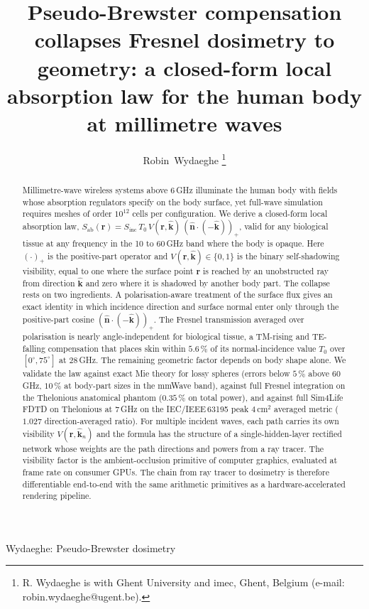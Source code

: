 \documentclass[journal,twocolumn,10pt]{IEEEtran}
\theoremstyle{plain}
\theoremstyle{remark}
\newcommand{\khat}{\hat{\bm{k}}}
\newcommand{\nhat}{\hat{\bm{n}}}
\newcommand{\rr}{\mathbf{r}}
\newcommand{\Sinc}{S_{\mathrm{inc}}}
\newcommand{\Sab}{S_{\mathrm{ab}}}
\newcommand{\pospart}[1]{\left(#1\right)_{+}}
\newcommand{\Vis}{V}
\begin{document}
\title{Pseudo-Brewster compensation collapses Fresnel
dosimetry to geometry: a closed-form local absorption
law for the human body at millimetre waves}

\author{Robin~Wydaeghe%
  \thanks{R. Wydaeghe is with Ghent University and imec, Ghent,
  Belgium (e-mail: robin.wydaeghe@ugent.be).}}

%
{Wydaeghe: Pseudo-Brewster dosimetry}

\maketitle

\begin{abstract}
Millimetre-wave wireless systems above 6\,GHz illuminate the human body
with fields whose absorption regulators specify on the body surface,
yet full-wave simulation requires meshes of order $10^{12}$ cells per
configuration. We derive a closed-form local absorption law,
$\Sab(\rr) = \Sinc\,T_0\,\Vis(\rr,\khat)\,\pospart{\nhat\cdot(-\khat)}$,
valid for any biological tissue at any frequency in the 10 to 60\,GHz
band where the body is opaque. Here $(\cdot)_+$ is the positive-part
operator and $\Vis(\rr,\khat) \in \{0,1\}$ is the binary self-shadowing
visibility, equal to one where the surface point $\rr$ is reached by an
unobstructed ray from direction $\khat$ and zero where it is shadowed
by another body part. The collapse rests on two ingredients. A
polarisation-aware treatment of the surface flux gives an exact
identity in which incidence direction and surface normal enter only
through the positive-part cosine $\pospart{\nhat\cdot(-\khat)}$. The
Fresnel transmission averaged over polarisation is nearly
angle-independent for biological tissue, a TM-rising and TE-falling
compensation that places skin within $5.6\,\%$ of its
normal-incidence value $T_0$ over $[0^\circ, 75^\circ]$ at $28\,$GHz.
The remaining geometric factor depends on body shape alone. We
validate the law against exact Mie theory for lossy spheres (errors
below $5\,\%$ above $60\,$GHz, $10\,\%$ at body-part sizes in the
mmWave band), against full Fresnel integration on the Thelonious
anatomical phantom ($0.35\,\%$ on total power), and against full
Sim4Life FDTD on Thelonious at $7\,$GHz on the IEC/IEEE\,63195 peak
$4\,\mathrm{cm}^2$ averaged metric ($1.027$ direction-averaged
ratio). For multiple incident waves, each path carries its own visibility
$\Vis(\rr,\khat_n)$ and the formula has the structure of a
single-hidden-layer rectified network whose weights are the path
directions and powers from a ray tracer. The visibility factor is the
ambient-occlusion primitive of computer graphics, evaluated at frame
rate on consumer GPUs. The chain from ray tracer to dosimetry is
therefore differentiable end-to-end with the same arithmetic primitives
as a hardware-accelerated rendering pipeline.
\end{abstract}
\end{document}
